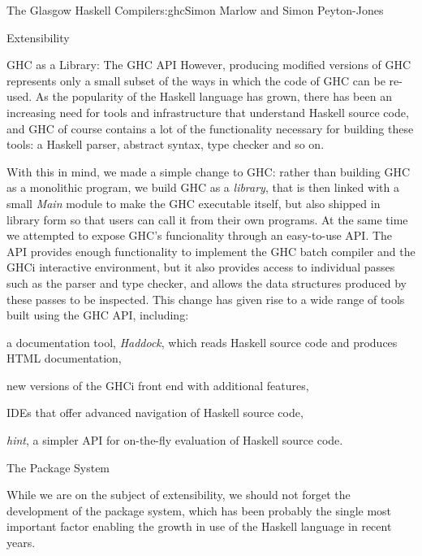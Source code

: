 \begin{aosachapter}{The Glasgow Haskell Compiler}{s:ghc}{Simon Marlow and Simon Peyton-Jones}
\begin{aosasect1}{Extensibility}
\begin{aosasect2}{GHC as a Library: The GHC API}
However, producing modified versions of GHC represents only a small
subset of the ways in which the code of GHC can be re-used.  As the
popularity of the Haskell language has grown, there has been an
increasing need for tools and infrastructure that understand Haskell
source code, and GHC of course contains a lot of the functionality
necessary for building these tools: a Haskell parser, abstract syntax,
type checker and so on.

With this in mind, we made a simple change to GHC: rather than
building GHC as a monolithic program, we build GHC as a
\emph{library}, that is then linked with a small \emph{Main} module to
make the GHC executable itself, but also shipped in library form so
that users can call it from their own programs.  At the same time we
attempted to expose GHC's funcionality through an easy-to-use API.
The API provides enough functionality to implement the GHC batch
compiler and the GHCi interactive environment, but it also provides
access to individual passes such as the parser and type checker, and
allows the data structures produced by these passes to be inspected.
This change has given rise to a wide range of tools built using the
GHC API, including:

\begin{aosaitemize}

\item a documentation tool, \emph{Haddock}, which reads Haskell source
  code and produces HTML documentation,

\item new versions of the GHCi front end with additional features,

\item IDEs that offer advanced navigation of Haskell source code,

\item \emph{hint}, a simpler API for on-the-fly evaluation of Haskell
  source code.

\end{aosaitemize}

\end{aosasect2}

\begin{aosasect2}{The Package System}

While we are on the subject of extensibility, we should not forget the
development of the package system, which has been probably the single
most important factor enabling the growth in use of the Haskell
language in recent years.


\end{aosasect2}
\end{aosasect1}
\end{aosachapter}
